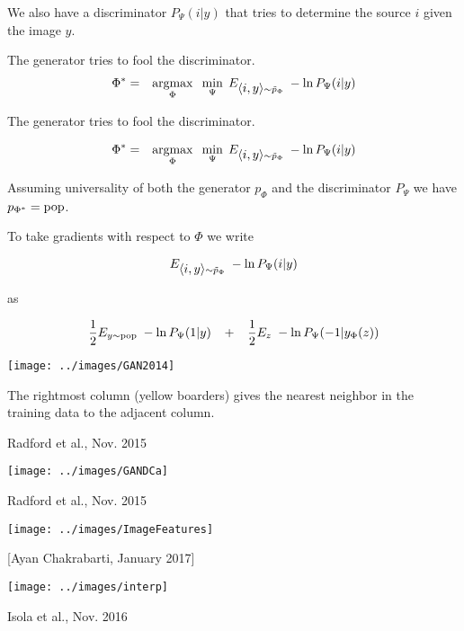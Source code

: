 {\vfill
We also have a discriminator $P_\Psi(i|y)$ that tries to determine the source $i$ given the image $y$.

\vfill
The generator tries to fool the discriminator.
\begin{eqnarray*}
\Phi^* & = & \operatorname*{argmax}_\Phi\;\;\min_\Psi\;E_{{\mbox{$\langle i,y\rangle$}} \sim \tilde{p}_\Phi}\;-\ln P_\Psi(i|y)
\end{eqnarray*}


The generator tries to fool the discriminator.

\vfill
\begin{eqnarray*}
\Phi^* & = & \operatorname*{argmax}_\Phi\;\;\min_\Psi\;E_{{\mbox{$\langle i,y\rangle$}} \sim \tilde{p}_\Phi}\;-\ln P_\Psi(i|y)
\end{eqnarray*}

\vfill
Assuming universality of both the generator $p_\Phi$ and the discriminator $P_\Psi$ we have {\color{red} $p_{\Phi^*} = \mathrm{pop}$}.


To take gradients with respect to $\Phi$ we write

\vfill
$$E_{{\mbox{$\langle i,y\rangle$}} \sim \tilde{p}_\Phi}\;-\ln P_\Psi(i|y)$$

\vfill
as

\vfill
$$\frac{1}{2} E_{y \sim \mathrm{pop}}\;-\ln P_\Psi(1|y) \;\;\;+\;\;\; \frac{1}{2} E_z\;-\ln P_\Psi(-1|y_\Phi(z))$$

\centerline{\texttt{[image: ../images/GAN2014]}}
The rightmost column (yellow boarders) gives the nearest neighbor in the training data to the adjacent column.

{Radford et al., Nov. 2015}

\centerline{\texttt{[image: ../images/GANDCa]}}

{Radford et al., Nov. 2015}

\centerline{\texttt{[image: ../images/ImageFeatures]}}


[Ayan Chakrabarti, January 2017]

\centerline{\texttt{[image: ../images/interp]}}


{Isola et al., Nov. 2016}

}
